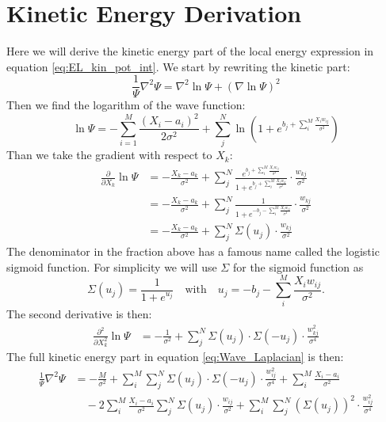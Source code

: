 \documentclass[12pt,a4paper,english]{article}
\begin{document}
\section{Kinetic Energy Derivation}
\label{appendix:E_k}
Here we will derive the kinetic energy part of the local energy expression in equation \ref{eq:EL_kin_pot_int}. We start by rewriting the kinetic part:
\begin{equation}
\label{eq:Wave_Laplacian}
\frac{1}{\Psi}\nabla^2\Psi=\nabla^2\ln\Psi + (\nabla\ln\Psi)^2
\end{equation}
Then we find the logarithm of the wave function:
\begin{equation}
\ln\Psi=-\sum_{i=1}^{M}\frac{(X_i-a_i)^2}{2\sigma^2}+\sum_{j}^{N}\ln\left(1+e^{b_j + \sum_{i}^{M}\frac{X_iw_{ij}}{\sigma^2}}
\right)
\end{equation}
Than we take the gradient with respect to $X_k$:
\begin{align}
\label{eq:Gradient_Xk}
\frac{\partial }{\partial X_k}\ln\Psi&=-\frac{X_k-a_k}{\sigma^2} + \sum_{j}^{N}\frac{e^{b_j + \sum_{i}^{M}\frac{X_iw_{ij}}{\sigma^2}}}{1+e^{b_j + \sum_{i}^{M}\frac{X_iw_{ij}}{\sigma^2}}}\cdot\frac{w_{kj}}{\sigma^2}\nonumber\\ &=-\frac{X_k-a_k}{\sigma^2} + \sum_{j}^{N}\frac{1}{1+e^{-b_j - \sum_{i}^{M}\frac{X_iw_{ij}}{\sigma^2}}}\cdot\frac{w_{kj}}{\sigma^2}\nonumber\\
&=-\frac{X_k-a_k}{\sigma^2} + \sum_{j}^{N}\Sigma(u_j)\cdot\frac{w_{kj}}{\sigma^2}
\end{align}
The denominator in the fraction above has a famous name called the logistic sigmoid function. For simplicity we will use $\Sigma$ for the sigmoid function as
\begin{equation}
\label{eq:sigmoid}
\Sigma(u_j)=\frac{1}{1+e^{u_j}}\quad \text{with} \quad u_j=-b_j - \sum_{i}^{M}\frac{X_iw_{ij}}{\sigma^2}.
\end{equation}
The second derivative is then:
\begin{align}
\label{eq:2nd_Gradient_Xk}
\frac{\partial^2 }{\partial X_k^2}\ln\Psi&=-\frac{1}{\sigma^2}+\sum_{j}^{N}\Sigma(u_j)\cdot\Sigma(-u_j)\cdot\frac{w_{kj}^2}{\sigma^4}
\end{align}
The full kinetic energy part in equation \ref{eq:Wave_Laplacian} is then:
\begin{align*}
\frac{1}{\Psi}\nabla^2\Psi&= -\frac{M}{\sigma^2} +\sum_{i}^{M}\sum_{j}^{N}\Sigma(u_j)\cdot\Sigma(-u_j)\cdot\frac{w_{ij}^2}{\sigma^4} +\sum_{i}^{M}\frac{X_i-a_i}{\sigma^2}\\ 
&\quad -2\sum_{i}^{M}\frac{X_i-a_i}{\sigma^2}\sum_{j}^{N}\Sigma(u_j)\cdot\frac{w_{ij}}{\sigma^2} 
+\sum_{i}^{M}\sum_{j}^{N}(\Sigma(u_j))^2\cdot\frac{w_{ij}^2}{\sigma^4}
\end{align*}
\end{document}
